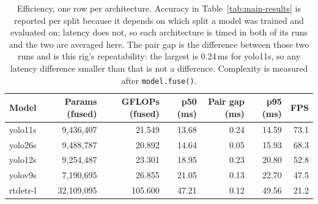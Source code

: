 \begin{table}[t]
  \centering
  \caption{Efficiency, one row per architecture. Accuracy in Table~\ref{tab:main-results} is reported per split because it depends on which split a model was trained and evaluated on; latency does not, so each architecture is timed in both of its runs and the two are averaged here. The pair gap is the difference between those two runs and is this rig's repeatability: the largest is 0.24\,ms for yolo11s, so any latency difference smaller than that is not a difference. Complexity is measured after \texttt{model.fuse()}.}
  \label{tab:efficiency}
  \begin{tabular}{lrrrrrr}
    \toprule
    Model & Params (fused) & GFLOPs (fused) & p50 (ms) & Pair gap (ms) & p95 (ms) & FPS \\
    \midrule
    yolo11s & 9,436,407 & 21.549 & 13.68 & 0.24 & 14.59 & 73.1 \\
    yolo26s & 9,488,787 & 20.892 & 14.64 & 0.05 & 15.93 & 68.3 \\
    yolo12s & 9,254,487 & 23.301 & 18.95 & 0.23 & 20.80 & 52.8 \\
    yolov9s & 7,190,695 & 26.855 & 21.05 & 0.13 & 22.70 & 47.5 \\
    rtdetr-l & 32,109,095 & 105.600 & 47.21 & 0.12 & 49.56 & 21.2 \\
    \bottomrule
  \end{tabular}
\end{table}
